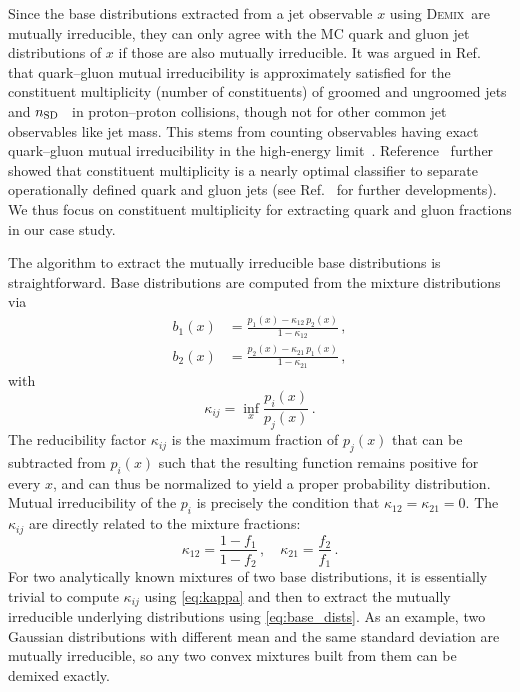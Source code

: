 \documentclass[aps,prl,twocolumn,preprintnumbers,showpacs,floatfix,nofootinbib]{revtex4-1}
\newcommand*{\demix}{\textsc{Demix}}
\newcommand{\Refc}[1]{Ref.~\cite{#1}}
\newcommand{\Reflc}[1]{Reference~\cite{#1}}
\newcommand{\nSD}{\ensuremath n_\text{SD}}
\begin{document}
Since the base distributions extracted from a jet observable $x$ using \demix\ are mutually irreducible, they can only agree with the MC quark and gluon jet distributions of $x$ if those are also mutually irreducible.
%
It was argued in \Refc{Metodiev:2018ftz} that quark--gluon mutual irreducibility is approximately satisfied for the constituent multiplicity (number of constituents) of groomed and ungroomed jets and $\nSD$~\cite{Frye:2017yrw} in proton--proton collisions, though not for other common jet observables like jet mass.
%
This stems from counting observables having exact quark--gluon mutual irreducibility in the high-energy limit~\cite{Frye:2017yrw}.
%
\Reflc{Komiske:2018vkc} further showed that constituent multiplicity is a nearly optimal classifier to separate operationally defined quark and gluon jets (see \Refc{Larkoski:2019nwj} for further developments).
%
We thus focus on constituent multiplicity for extracting quark and gluon fractions in our case study.


The algorithm to extract the mutually irreducible base distributions is straightforward.
%
Base distributions are computed from the mixture distributions via
%
\begin{equation}
	\label{eq:base_dists}
	\begin{aligned}
	    b_1(x) &= \frac{p_1(x) - \kappa_{1 2} \, p_2(x)}{1 - \kappa_{1 2}}\,, \\
	    b_2(x) &= \frac{p_2(x) - \kappa_{2 1} \, p_1(x)}{1 - \kappa_{2 1}}\,,
	\end{aligned}
\end{equation}
with
\begin{equation}
    \label{eq:kappa}
    \kappa_{i j} = \inf_x \frac{p_i(x)}{p_j(x)}\,.
\end{equation}
%
The reducibility factor $\kappa_{i j}$ is the maximum fraction of $p_j(x)$ that can be subtracted from $p_i(x)$ such that the resulting function remains positive for every $x$, and can thus be normalized to yield a proper probability distribution.
%
Mutual irreducibility of the $p_i$ is precisely the condition that $\kappa_{1 2} = \kappa_{2 1} = 0$.
%
The $\kappa_{i j}$ are directly related to the mixture fractions:
%
\begin{equation}
	\label{eqn:kappa}
	\kappa_{1 2} = \frac{1 - f_1}{1 - f_2}\,, \quad \kappa_{2 1} = \frac{f_2}{f_1}\,.
\end{equation}
%
For two analytically known mixtures of two base distributions, it is essentially trivial to compute $\kappa_{i j}$ using \cref{eq:kappa} and then to extract the mutually irreducible underlying distributions using \cref{eq:base_dists}.
%
As an example, two Gaussian distributions with different mean and the same standard deviation are mutually irreducible, so any two convex mixtures built from them can be demixed exactly.
\end{document}
